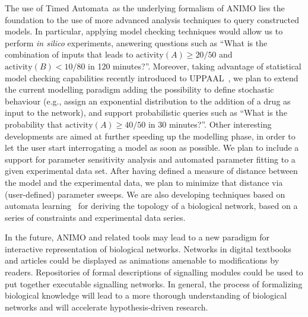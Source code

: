 \documentclass[journal, 10pt]{IEEEtran}
\def\tas{Timed Automata}
\begin{document}
The use of \tas\ as the underlying formalism of ANIMO lies the foundation to the use of more advanced 
analysis techniques to query constructed models. In particular, applying model checking techniques would allow us to perform \emph{in silico} experiments, answering questions
such as ``What is the combination of inputs that leads to $\mbox{activity}(A) \geq 20/50$
and $\mbox{activity}(B) < 10/80$ in 120 minutes?''. Moreover, taking advantage of statistical model
checking capabilities recently introduced to UPPAAL~\cite{uppaal-smc}, we plan to extend the current modelling paradigm adding the possibility
to define stochastic behaviour (e.g., assign an exponential distribution to the addition of a drug as input to the network),
and support probabilistic queries such as ``What is the probability that
$\mbox{activity}(A) \geq 40/50$ in 30 minutes?''.
Other interesting developments are aimed at further speeding up the modelling phase, in order to let the user
start interrogating a model as soon as possible. We plan to include a support for parameter
sensitivity analysis and automated parameter fitting to a given experimental data set. 
After having defined a measure of distance between the model and the experimental data, we plan to minimize that distance
via (user-defined) parameter sweeps.
We are also developing
techniques based on automata learning~\cite{test-based-modelling} for deriving the topology of a biological network, based
on a series of constraints and experimental data series.

In the future, ANIMO and related tools may lead to a new paradigm for interactive representation of
biological networks. Networks in digital textbooks and articles could be displayed as animations amenable to
modifications by readers. Repositories of formal descriptions of signalling modules could be used to put together
executable signalling networks. In general, the process of formalizing biological knowledge will lead
to a more thorough understanding of biological networks and will accelerate hypothesis-driven research.



\end{document}
